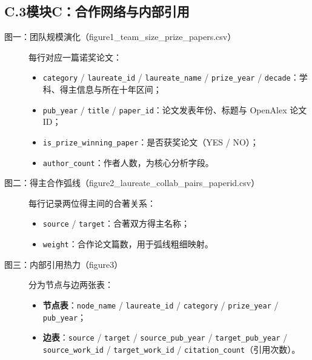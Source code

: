 \documentclass[UTF8]{CjC}
\theoremstyle{mystyle}
\begin{document}
{\subsection*{C.3\quad 模块C：合作网络与内部引用}
\begin{description}
    \item[图一：团队规模演化（figure1\_team\_size\_prize\_papers.csv）] 每行对应一篇诺奖论文：
    \begin{itemize}
        \item \texttt{category} / \texttt{laureate\_id} / \texttt{laureate\_name} / \texttt{prize\_year} / \texttt{decade}：学科、得主信息与所在十年区间；
        \item \texttt{pub\_year} / \texttt{title} / \texttt{paper\_id}：论文发表年份、标题与 OpenAlex 论文 ID；
        \item \texttt{is\_prize\_winning\_paper}：是否获奖论文（YES / NO）；
        \item \texttt{author\_count}：作者人数，为核心分析字段。
    \end{itemize}
    \item[图二：得主合作弧线（figure2\_laureate\_collab\_pairs\_paperid.csv）] 每行记录两位得主间的合著关系：
    \begin{itemize}
        \item \texttt{source} / \texttt{target}：合著双方得主名称；
        \item \texttt{weight}：合作论文篇数，用于弧线粗细映射。
    \end{itemize}
    \item[图三：内部引用热力（figure3）] 分为节点与边两张表：
    \begin{itemize}
        \item \textbf{节点表}：\texttt{node\_name} / \texttt{laureate\_id} / \texttt{category} / \texttt{prize\_year} / \texttt{pub\_year}；
        \item \textbf{边表}：\texttt{source} / \texttt{target} / \texttt{source\_pub\_year} / \texttt{target\_pub\_year} / \texttt{source\_work\_id} / \texttt{target\_work\_id} / \texttt{citation\_count}（引用次数）。
    \end{itemize}
\end{description}

}
\end{document}
